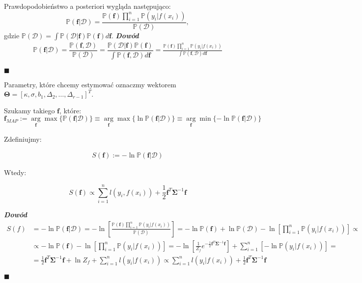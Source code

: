 \documentclass[12pt,a4paper]{article}
\newenvironment{dow}{\textbf{\textit{Dowód}}}{\begin{flushright} $\blacksquare$ \end{flushright}}
\newcommand{\argmin}{\arg\!\min}
\newcommand{\argmax}{\arg\!\max}
\begin{document}
Prawdopodobieństwo a posteriori wygląda następująco:
$$
\mathbb{P}(\mathbf{f}|\mathcal{D}) = \frac{\mathbb{P}(\mathbf{f})\prod_{i=1}^n\mathbb{P}(y_i|f(x_i))}{\mathbb{P}(\mathcal{D})},
$$
gdzie $\mathbb{P}(\mathcal{D})=\int \mathbb{P}(\mathcal{D}|\mathbf{f})\mathbb{P}(\mathbf{f}) d\mathbf{f}$.
\newline
\newline
\begin{dow}
\begin{align*}
\mathbb{P}(\mathbf{f}|\mathcal{D}) = \dfrac{\mathbb{P}(\mathbf{f},\mathcal{D})}{\mathbb{P}(\mathcal{D})} 
= \dfrac{\mathbb{P}(\mathcal{D}|\mathbf{f})\mathbb{P}(\mathbf{f})}{\int \mathbb{P}(\mathbf{f},\mathcal{D}) d\mathbf{f}} =
\frac{\mathbb{P}(\mathbf{f})\prod_{i=1}^n\mathbb{P}(y_i|f(x_i))}{\int \mathbb{P}(\mathbf{f},\mathcal{D}) d\mathbf{f}}
\end{align*}
\end{dow}

Parametry, które chcemy estymować oznaczmy wektorem $\mathbf{\Theta} = [\kappa, \sigma, b_1, \Delta_2, \ldots, \Delta_{r-1}]^T$.

Szukamy takiego $\mathbf{f}$, które:
$$
\mathbf{f}_{MAP}:=\underset{\mathbf{f}}\argmax \lbrace \mathbb{P}(\mathbf{f}|\mathcal{D}) \rbrace \equiv \underset{\mathbf{f}}\argmax \lbrace \ln\mathbb{P}(\mathbf{f}|\mathcal{D}) \rbrace \equiv \underset{\mathbf{f}}\argmin \lbrace -\ln\mathbb{P}(\mathbf{f}|\mathcal{D}) \rbrace
$$

Zdefiniujmy:

\begin{align*}
S(\mathbf{f}) := 
-\ln\mathbb{P}(\mathbf{f}|\mathcal{D})
\end{align*}

Wtedy:

$$
S(\mathbf{f}) \propto 
\sum_{i=1}^n\textit{l}(y_i, f(x_i)) + \frac{1}{2}\mathbf{f}^T\mathbf{\Sigma}^{-1}\mathbf{f}
$$

\begin{dow}
\begin{align*}
S(f) &= 
-\ln\mathbb{P}(\mathbf{f}|\mathcal{D}) =
-\ln \left[ \frac{\mathbb{P}(\mathbf{f})\prod_{i=1}^n\mathbb{P}(y_i|f(x_i))}{\mathbb{P}(\mathcal{D})} \right] =
-\ln\mathbb{P}(\mathbf{f}) + \ln\mathbb{P}(\mathcal{D}) - \ln \left[ \prod_{i=1}^n\mathbb{P}(y_i|f(x_i)) \right] \propto \\ &\propto 
-\ln\mathbb{P}(\mathbf{f}) - \ln \left[ \prod_{i=1}^n\mathbb{P}(y_i|f(x_i)) \right] =
-\ln\left[ \frac{1}{Z_f}e^{-\frac{1}{2}\mathbf{f}^T\mathbf{\Sigma}^{-1}\mathbf{f}} \right] + \sum_{i=1}^n \left[ -\ln\mathbb{P}(y_i|f(x_i)) \right] = \\ &=
\frac{1}{2}\mathbf{f}^T\mathbf{\Sigma}^{-1}\mathbf{f} + \ln Z_f + \sum_{i=1}^n \textit{l}(y_i|f(x_i)) \propto
\sum_{i=1}^n \textit{l}(y_i|f(x_i)) + \frac{1}{2}\mathbf{f}^T\mathbf{\Sigma}^{-1}\mathbf{f}
\end{align*}
\end{dow}
\end{document}
